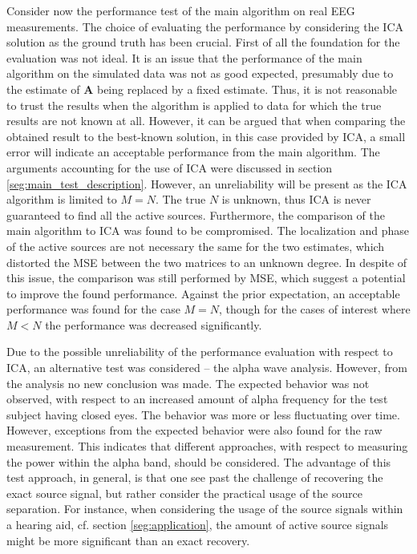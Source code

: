 Consider now the performance test of the main algorithm on real EEG measurements. 
The choice of evaluating the performance by considering the ICA solution as the ground truth has been crucial. 
First of all the foundation for the evaluation was not ideal. 
It is an issue that the performance of the main algorithm on the simulated data was not as good expected, presumably due to the estimate of $\mathbf{A}$ being replaced by a fixed estimate. 
Thus, it is not reasonable to trust the results when the algorithm is applied to data for which the true results are not known at all. 
However, it can be argued that when comparing the obtained result to the best-known solution, in this case provided by ICA, a small error will indicate an acceptable performance from the main algorithm. 
The arguments accounting for the use of ICA were discussed in section \ref{seg:main_test_description}. 
However, an unreliability will be present as the ICA algorithm is limited to $M = N$. 
The true $N$ is unknown, thus ICA is never guaranteed to find all the active sources.
Furthermore, the comparison of the main algorithm to ICA was found to be compromised. 
The localization and phase of the active sources are not necessary the same for the two estimates, which distorted the MSE between the two matrices to an unknown degree.
In despite of this issue, the comparison was still performed by MSE, which suggest a potential to improve the found performance. 
Against the prior expectation, an acceptable performance was found for the case $M = N$, though for the cases of interest where $M < N$ the performance was decreased significantly.    

Due to the possible unreliability of the performance evaluation with respect to ICA, an alternative test was considered -- the alpha wave analysis. 
However, from the analysis no new conclusion was made. The expected behavior was not observed, with respect to an increased amount of alpha frequency for the test subject having closed eyes.
The behavior was more or less fluctuating over time. However, exceptions from the expected behavior were also found for the raw measurement. This indicates that different approaches, with respect to measuring the power within the alpha band, should be considered.
The advantage of this test approach, in general, is that one see past the challenge of recovering the exact source signal, but rather consider the practical usage of the source separation. For instance, when considering the usage of the source signals within a hearing aid, cf. section \ref{seg:application}, the amount of active source signals might be more significant than an exact recovery.         

